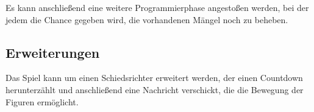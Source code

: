 Es kann anschließend eine weitere Programmierphase angestoßen werden,
bei der jedem die Chance gegeben wird, die vorhandenen Mängel noch zu
beheben.

\subsection{Erweiterungen}\label{erweiterungen}

Das Spiel kann um einen Schiedsrichter erweitert werden, der einen
Countdown herunterzählt und anschließend eine Nachricht verschickt, die
die Bewegung der Figuren ermöglicht.
